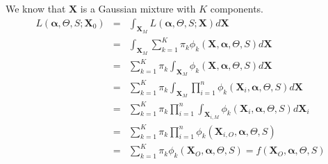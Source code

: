 \documentclass[11pt,a4paper]{report}
\begin{document}
%		

We know that $\boldsymbol{X}$ is a Gaussian mixture with $K$ components.
\begin{eqnarray}
	L(\boldsymbol{\alpha},\Theta,S;\boldsymbol{X}_0)&=&\int_{\boldsymbol{X}_M}L(\boldsymbol{\alpha},\Theta,S;\boldsymbol{X})d\boldsymbol{X} \\
	&=&\int_{\boldsymbol{X}_M}\sum_{k=1}^K \pi_k \phi_k(\boldsymbol{X},\boldsymbol{\alpha},\Theta,S)d\boldsymbol{X} \\
	&=&\sum_{k=1}^K \pi_k \int_{\boldsymbol{X}_M}\phi_k(\boldsymbol{X},\boldsymbol{\alpha},\Theta,S)d\boldsymbol{X} \\
	&=&\sum_{k=1}^K \pi_k \int_{\boldsymbol{X}_M}\prod_{i=1}^n\phi_k(\boldsymbol{X}_i,\boldsymbol{\alpha},\Theta,S)d\boldsymbol{X} \\
	&=&\sum_{k=1}^K \pi_k \prod_{i=1}^n\int_{\boldsymbol{X}_{i,M}}\phi_k(\boldsymbol{X}_i,\boldsymbol{\alpha},\Theta,S)d\boldsymbol{X}_i \\
	&=&\sum_{k=1}^K \pi_k \prod_{i=1}^n\phi_k(\boldsymbol{X}_{i,O},\boldsymbol{\alpha},\Theta,S)\\
	&=&\sum_{k=1}^K \pi_k \phi_k(\boldsymbol{X}_{O},\boldsymbol{\alpha},\Theta,S)=f(\boldsymbol{X}_{O},\boldsymbol{\alpha},\Theta,S)
\end{eqnarray}
\end{document}
